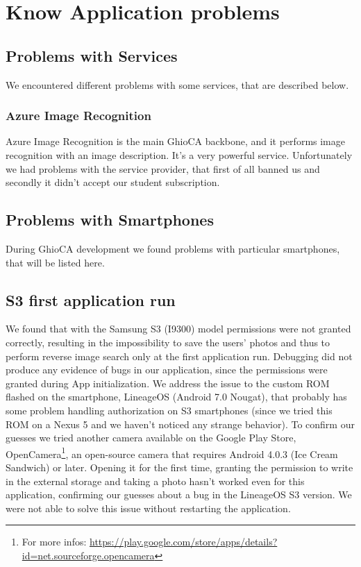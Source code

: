 \section{Know Application problems}

\subsection{Problems with Services}

We encountered different problems with some services, that are described below.

\subsubsection{Azure Image Recognition}

Azure Image Recognition is the main GhioCA backbone, and it performs image 
recognition with an image description. It's a very powerful service. 
Unfortunately we had problems with the service provider, that first of 
all banned us and secondly it didn't accept our student subscription.

\subsection{Problems with Smartphones}

During GhioCA development we found problems with particular smartphones, that
will be listed here.

\subsection{S3 first application run}

We found that with the Samsung S3 (I9300) model permissions were not granted
correctly, resulting in the impossibility to save the users' photos and thus to
perform reverse image search only at the first application run. Debugging did
not produce any evidence of bugs in our application, since the permissions were
granted during App initialization.
We address the issue to the custom ROM flashed on the smartphone, LineageOS
(Android 7.0 Nougat), that probably has some problem handling authorization on
S3 smartphones (since we tried this ROM on a Nexus 5 and we haven't noticed any
strange behavior).
To confirm our guesses we tried another camera available on the Google Play
Store, OpenCamera\footnote{For more infos:
\url{https://play.google.com/store/apps/details?id=net.sourceforge.opencamera}},
 an open-source camera that requires Android 4.0.3 (Ice Cream Sandwich) or
later.
Opening it for the first time, granting the permission to write in the external
storage and taking a photo hasn't worked even for this application, confirming
our guesses about a bug in the LineageOS S3 version.
We were not able to solve this issue without restarting the application.
